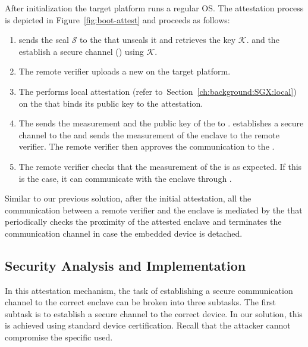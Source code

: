  After initialization the target platform runs a regular OS. The attestation process is depicted in Figure~\ref{fig:boot-attest} and proceeds as follows:

\begin{enumerate}


  \item[\one] \device sends the seal $\mathcal{S}$ to the \nameclave that unseals it and retrieves the key $\mathcal{K}$. \device and the \nameclave establish a secure channel (\tls) using $\mathcal{K}$.

  \item[\two] The remote verifier uploads a new \app on the target platform.

  \item[\three] The \nameclave performs local attestation (refer to~Section~\ref{ch:background:SGX:local}) on the \app that binds its public key to the attestation. %

  \item[\four] The \nameclave sends the measurement and the public key of the \app to \device. \device establishes a secure channel to the \app and sends the measurement of the enclave to the remote verifier. The remote verifier then approves the communication to the \app.

  \item[\five] The remote verifier checks that the measurement of the \app is as expected. If this is the case, it can communicate with the enclave through \device.


\end{enumerate}


Similar to our previous solution, after the initial attestation, all the communication between a remote verifier and the enclave is mediated by the \device that periodically checks the proximity of the attested enclave and terminates the communication channel in case the embedded device is detached.


\subsection{Security Analysis and Implementation}
 
In this attestation mechanism, the task of establishing a secure communication channel to the correct enclave can be broken into three subtasks. The first subtask is to establish a secure channel to the correct \device device. In our solution, this is achieved using standard device certification. Recall that the attacker cannot compromise the specific \device used. 

